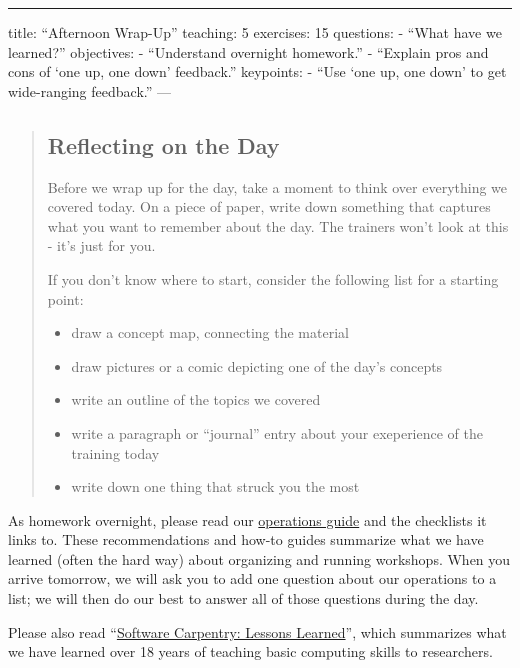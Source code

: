 \begin{center}
\rule{3in}{0.4pt}
\end{center}
title: ``Afternoon Wrap-Up''
teaching: 5
exercises: 15
questions:
- ``What have we learned?''
objectives:
- ``Understand overnight homework.''
- ``Explain pros and cons of `one up, one down' feedback.''
keypoints:
- ``Use `one up, one down' to get wide-ranging feedback.''
---

\begin{quotation}   %
\subsection*{Reflecting on the Day}

Before we wrap up for the day, take a moment to think over 
everything we covered today.  On a piece of paper, write 
down something that captures what you want to remember about 
the day.  The trainers won't look at this - it's just for you.

If you don't know where to start, consider 
the following list for a starting point:

\begin{itemize}
\item draw a concept map, connecting the material
\item draw pictures or a comic depicting one of the day's concepts
\item write an outline of the topics we covered
\item write a paragraph or “journal” entry about your 
exeperience of the training today
\item write down one thing that struck you the most
\end{itemize}
\end{quotation}   %

As homework overnight,
please read our \href{\{\{ site.swc\_site \}\}/workshops/operations/}{operations guide}
and the checklists it links to.
These recommendations and how-to guides summarize what we have learned
(often the hard way)
about organizing and running workshops.
When you arrive tomorrow,
we will ask you to add one question about our operations to a list;
we will then do our best to answer all of those questions during the day.

Please also read ``\href{\{\{ page.root \}\}/files/papers/wilson-lessons-learned-2016.pdf}{Software Carpentry: Lessons Learned}'',
which summarizes what we have learned over 18 years of teaching basic computing skills to researchers.

